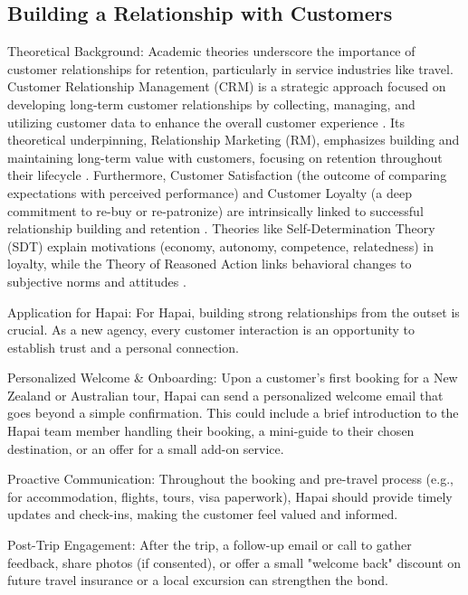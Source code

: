 \documentclass{article}
\begin{document}
\subsection{Building a Relationship with Customers}

Theoretical Background:
Academic theories underscore the importance of customer relationships for retention, particularly in service industries like travel. Customer Relationship Management (CRM) is a strategic approach focused on developing long-term customer relationships by collecting, managing, and utilizing customer data to enhance the overall customer experience \cite{ledro_artificial_2022}. Its theoretical underpinning, Relationship Marketing (RM), emphasizes building and maintaining long-term value with customers, focusing on retention throughout their lifecycle \cite{petzer_customer_nodate}. Furthermore, Customer Satisfaction (the outcome of comparing expectations with perceived performance) and Customer Loyalty (a deep commitment to re-buy or re-patronize) are intrinsically linked to successful relationship building and retention \cite{komalasari_customer_2018}. Theories like Self-Determination Theory (SDT) explain motivations (economy, autonomy, competence, relatedness) in loyalty, while the Theory of Reasoned Action links behavioral changes to subjective norms and attitudes \cite{wang_exploring_nodate}.

Application for Hapai:
For Hapai, building strong relationships from the outset is crucial. As a new agency, every customer interaction is an opportunity to establish trust and a personal connection.

Personalized Welcome \& Onboarding: Upon a customer's first booking for a New Zealand or Australian tour, Hapai can send a personalized welcome email that goes beyond a simple confirmation. This could include a brief introduction to the Hapai team member handling their booking, a mini-guide to their chosen destination, or an offer for a small add-on service.

Proactive Communication: Throughout the booking and pre-travel process (e.g., for accommodation, flights, tours, visa paperwork), Hapai should provide timely updates and check-ins, making the customer feel valued and informed.

Post-Trip Engagement: After the trip, a follow-up email or call to gather feedback, share photos (if consented), or offer a small "welcome back" discount on future travel insurance or a local excursion can strengthen the bond.
\end{document}
